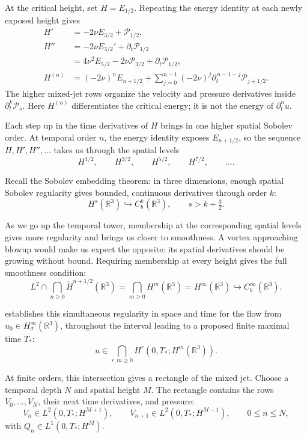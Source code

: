 At the critical height, set \(H=E_{1/2}\). Repeating the energy identity
at each newly exposed height gives
\[
 \begin{aligned}
 H'&=-2\nu E_{3/2}+\mathcal P_{1/2},\\
 H''&=-2\nu E_{3/2}'+\partial_t\mathcal P_{1/2}\\
    &=4\nu^2E_{5/2}-2\nu\mathcal P_{3/2}
        +\partial_t\mathcal P_{1/2},\\
 H^{(n)}&=(-2\nu)^nE_{n+1/2}
        +\sum_{j=0}^{n-1}(-2\nu)^j
           \partial_t^{\,n-1-j}\mathcal P_{j+1/2}.
 \end{aligned}
\]
The higher mixed-jet rows organize the velocity and pressure derivatives
inside \(\partial_t^k\mathcal P_s\). Here \(H^{(n)}\) differentiates the
critical energy; it is not the energy of \(\partial_t^nu\).

Each step up in the time derivatives of \(H\) brings in one higher spatial
Sobolev order. At temporal order \(n\), the energy identity exposes
\(E_{n+1/2}\), so the sequence \(H,H',H'',\ldots\) takes us through
the spatial levels
\[
 H^{1/2},\qquad H^{3/2},\qquad H^{5/2},\qquad H^{7/2},\qquad\ldots.
\]

\label{guide:intersection}
Recall the Sobolev embedding theorem: in three dimensions, enough spatial
Sobolev regularity gives bounded, continuous derivatives through order \(k\):
\[
 H^s(\mathbb R^3)\hookrightarrow C_b^k(\mathbb R^3),
 \qquad s>k+\tfrac32.
\]

As we go up the temporal tower, membership at the corresponding spatial
levels gives more regularity and brings us closer to smoothness. A vortex
approaching blowup would make us expect the opposite: its spatial derivatives
should be growing without bound. Requiring membership at every height gives
the full smoothness condition:
\[
 L^2\cap\bigcap_{n\ge0}\dot H^{n+1/2}(\mathbb R^3)
 =\bigcap_{m\ge0}H^m(\mathbb R^3)
 =H^\infty(\mathbb R^3)\hookrightarrow C_b^\infty(\mathbb R^3).
\]

 establishes this simultaneous
regularity in space and time for the flow from
\(u_0\in H^\infty_\sigma(\mathbb R^3)\), throughout the interval leading
to a proposed finite maximal time \(T_*\):
\[
 u\in\bigcap_{r,m\ge0}H^r(0,T_*;H^m(\mathbb R^3)).
\]

At finite orders, this intersection gives a rectangle of the mixed jet.
Choose a temporal depth \(N\) and spatial height \(M\). The rectangle
contains the rows \(V_0,\ldots,V_N\), their next time derivatives, and
pressure:
\[
 V_n\in L^2(0,T_*;H^{M+1}),\qquad
 V_{n+1}\in L^2(0,T_*;H^{M-1}),\qquad 0\le n\le N,
\]
with \(Q_n\in L^1(0,T_*;H^M)\).

